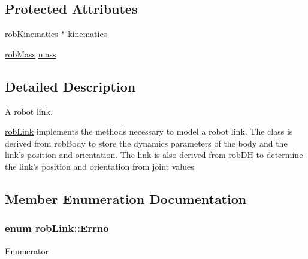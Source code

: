 \subsection*{Protected Attributes}
\begin{DoxyCompactItemize}
\item 
\hyperlink{classrob_kinematics}{rob\-Kinematics} $\ast$ \hyperlink{classrob_link_a4aa26f90307b406c336f9b7fae00b905}{kinematics}
\item 
\hyperlink{classrob_mass}{rob\-Mass} \hyperlink{classrob_link_a7b524ebf9d101bc369749585db1ba66d}{mass}
\end{DoxyCompactItemize}


\subsection{Detailed Description}
A robot link. 

\hyperlink{classrob_link}{rob\-Link} implements the methods necessary to model a robot link. The class is derived from rob\-Body to store the dynamics parameters of the body and the link's position and orientation. The link is also derived from \hyperlink{classrob_d_h}{rob\-D\-H} to determine the link's position and orientation from joint values 

\subsection{Member Enumeration Documentation}
\hypertarget{classrob_link_aeafaa7aaa6cb47af0db3b746606c0bd0}{
\subsubsection[{Errno}]{\setlength{\rightskip}{0pt plus 5cm}enum {\bf rob\-Link\-::\-Errno}}}\label{classrob_link_aeafaa7aaa6cb47af0db3b746606c0bd0}
\begin{Desc}
\item[Enumerator]\par
\begin{description}
\item[{\em 
\hypertarget{classrob_link_aeafaa7aaa6cb47af0db3b746606c0bd0a50ca3684acd35bf81c30fbb7d9fe5652}{E\-S\-U\-C\-C\-E\-S\-S}\label{classrob_link_aeafaa7aaa6cb47af0db3b746606c0bd0a50ca3684acd35bf81c30fbb7d9fe5652}
}]\item[{\em 
\hypertarget{classrob_link_aeafaa7aaa6cb47af0db3b746606c0bd0a0506973f35ceab0b466f40856a327ca7}{E\-F\-A\-I\-L\-U\-R\-E}\label{classrob_link_aeafaa7aaa6cb47af0db3b746606c0bd0a0506973f35ceab0b466f40856a327ca7}
}]\end{description}
\end{Desc}


